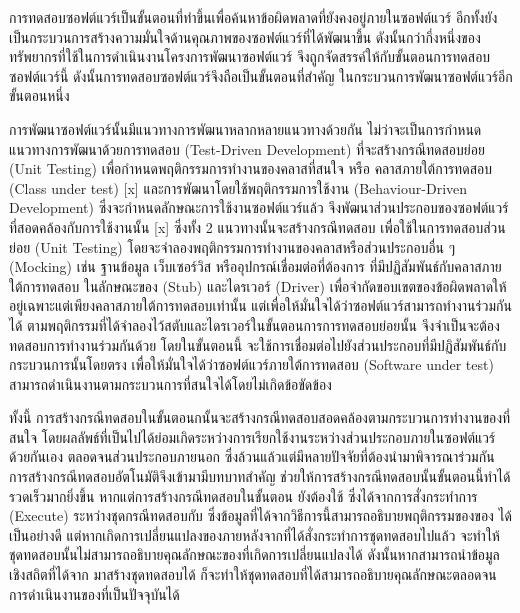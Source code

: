 การทดสอบซอฟต์แวร์เป็นขั้นตอนที่ทำขึ้นเพื่อค้นหาข้อผิดพลาดที่ยังคงอยู่ภายในซอฟต์แวร์ \cite{Myers:2011:AST:983238} 
อีกทั้งยังเป็นกระบวนการสร้างความมั่นใจด้านคุณภาพของซอฟต์แวร์ที่ได้พัฒนาขึ้น ดังนั้นกว่ากึ่งหนึ่งของทรัพยากรที่ใช้ในการดำเนินงานโครงการพัฒนาซอฟต์แวร์
จึงถูกจัดสรรค์ให้กับขั้นตอนการทดสอบซอฟต์แวร์นี้ \cite{Jackson2007, Tassey2002} ดังนั้นการทดสอบซอฟต์แวร์จึงถือเป็นขั้นตอนที่สำคัญ
ในกระบวนการพัฒนาซอฟต์แวร์อีกขั้นตอนหนึ่ง

การพัฒนาซอฟต์แวร์นั้นมีแนวทางการพัฒนาหลากหลายแนวทางด้วยกัน ไม่ว่าจะเป็นการกำหนดแนวทางการพัฒนาด้วยการทดสอบ (Test-Driven Development) 
ที่จะสร้างกรณีทดสอบย่อย (Unit Testing) เพื่อกำหนดพฤติกรรมการทำงานของคลาสที่สนใจ หรือ คลาสภายใต้การทดสอบ (Class under test) [x]
และการพัฒนาโดยใช้พฤติกรรมการใช้งาน (Behaviour-Driven Development) ซึ่งจะกำหนดลักษณะการใช้งานซอฟต์แวร์แล้ว
จึงพัฒนาส่วนประกอบของซอฟต์แวร์ที่สอดคล้องกับการใช้งานนั้น [x] 
ซึ่งทั้ง 2 แนวทางนั้นจะสร้างกรณีทดสอบ เพื่อใช้ในการทดสอบส่วนย่อย (Unit Testing) โดยจะจำลองพฤติกรรมการทำงานของคลาสหรือส่วนประกอบอื่น ๆ
(Mocking) เช่น ฐานข้อมูล เว็บเซอร์วิส หรืออุปกรณ์เชื่อมต่อที่ต้องการ ที่มีปฏิสัมพันธ์กับคลาสภายใต้การทดสอบ ในลักษณะของ (Stub) และไดรเวอร์ (Driver)
เพื่อจำกัดขอบเขตของข้อผิดพลาดให้อยู่เฉพาะแต่เพียงคลาสภายใต้การทดสอบเท่านั้น แต่เพื่อให้มั่นใจได้ว่าซอฟต์แวร์สามารถทำงานร่วมกันได้ 
ตามพฤติกรรมที่ได้จำลองไว้สตับและไดรเวอร์ในขั้นตอนการการทดสอบย่อยนั้น 
จึงจำเป็นจะต้องทดสอบการทำงานร่วมกันด้วย\FirstTimeDefine{\IntegrationTesting}{\IntegrationTestingEN}
โดยในขั้นตอนนี้ จะใช้การเชื่อมต่อไปยังส่วนประกอบที่มีปฏิสัมพันธ์กับกระบวนการนั้นโดยตรง เพื่อให้มั่นใจได้ว่าซอฟต์แวร์ภายใต้การทดสอบ (Software under test) 
สามารถดำเนินงานตามกระบวนการที่สนใจได้โดยไม่เกิดข้อขัดข้อง

ทั้งนี้ การสร้างกรณีทดสอบในขั้นตอนก{\IntegrationTesting}นั้นจะสร้างกรณีทดสอบสอดคล้องตามกระบวนการทำงานของ{\SUT}ที่สนใจ 
โดยผลลัพธ์ที่เป็นไปได้ย่อมเกิดระหว่างการเรียกใช้งานระหว่างส่วนประกอบภายในซอฟต์แวร์{\SUT}ด้วยกันเอง ตลอดจนส่วนประกอบภายนอก 
ซึ่งล้วนแล้วแต่มีหลายปัจจัยที่ต้องนำมาพิจารณาร่วมกัน การสร้างกรณีทดสอบอัตโนมัติจึงเข้ามามีบทบาทสำคัญ ช่วยให้การสร้างกรณีทดสอบนั้นขั้นตอนนี้ทำได้รวดเร็วมากยิ่งขึ้น 
หากแต่การสร้างกรณีทดสอบในขั้นตอน{\IntegrationTesting} ยังต้องใช้\FirstTimeDefine{\DynamicInformation}{\DynamicInformationEN}
ซึ่งได้จากการสั่งกระทำการ (Execute) ระหว่างชุดกรณีทดสอบกับ{\sourcecode} ซึ่งข้อมูลที่ได้จากวิธีการนี้สามารถอธิบายพฤติกรรมของ{\SUT}ของ{\sourcecode}
ได้เป็นอย่างดี แต่หากเกิดการเปลี่ยนแปลงของ{\sourcecode}ภายหลังจากที่ได้สั่งกระทำการชุดทดสอบไปแล้ว 
จะทำให้ชุดทดสอบนั้นไม่สามารถอธิบายคุณลักษณะของ{\sourcecode}ที่เกิดการเปลี่ยนแปลงได้ ดังนั้นหากสามารถนำข้อมูลเชิงสถิตที่ได้จาก{\sourcecode}
มาสร้างชุดทดสอบได้ ก็จะทำให้ชุดทดสอบที่ได้สามารถอธิบายคุณลักษณะตลอดจนการดำเนินงานของ{\SUT}ที่เป็นปัจจุบันได้

